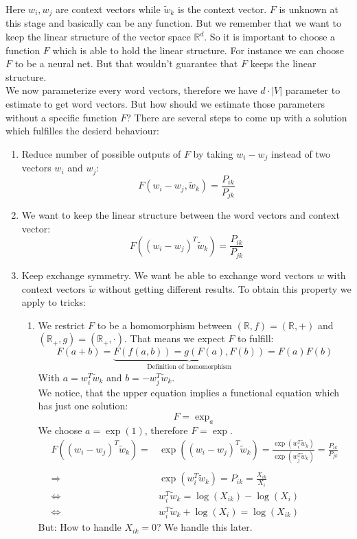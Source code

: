 Here $w_i, w_j$ are context vectors while $\tilde{w}_k$ is the context vector. 
$F$ is unknown at this stage and basically can be any function. But we remember
that we want to keep the linear structure of the vector space $\mathbb{R}^d$. So 
it is important to choose a function $F$ which is able to hold the linear 
structure. For instance we can choose $F$ to be a neural net. But that wouldn't 
guarantee that $F$ keeps the linear structure. \\

We now parameterize every word vectors, therefore we have $d \cdot |V|$ 
parameter to estimate to get word vectors. But how should we estimate those parameters 
without a specific function $F$? There are several steps to come up with a solution
which fulfilles the desierd behaviour:

\begin{enumerate}
  \item 
    Reduce number of possible outputs of $F$ by taking $w_i - w_j$ instead of 
    two vectors $w_i$ and $w_j$:
    \[
    F(w_i - w_j, \tilde{w}_k) = \frac{P_{ik}}{P_{jk}}
    \]

  \item 
    We want to keep the linear structure between the word vectors and context
    vector:
    \[
    F\left((w_i - w_j)^T\tilde{w}_k\right) = \frac{P_{ik}}{P_{jk}}
    \]
   
  \item 
    Keep exchange symmetry. We want be able to exchange word vectors $w$ with
    context vectors $\tilde{w}$ without getting different results. To obtain
    this property we apply to tricks:
      \begin{enumerate}
        \item 
          We restrict $F$ to be a homomorphism between $(\mathbb{R}, f) = (\mathbb{R}, +)$ 
          and $(\mathbb{R}_+, g) = (\mathbb{R}_+, \cdot )$. That means we expect $F$
          to fulfill:
          \[
          F(a + b) = \underbrace{F(f(a, b)) = g(F(a), F(b))}_{\text{Definition of homomorphism}} =
            F(a)F(b)
          \]
          With $a = w_i^T\tilde{w}_k$ and $b = -w_j^T\tilde{w}_k$. \\
          We notice, that the upper equation implies a functional equation which has
          just one solution: 
          \[
          F = \exp_a
          \]  
          We choose $a = \exp(1)$, therefore $F = \exp$. 
          \begin{align*}
          F\left((w_i - w_j)^T\tilde{w}_k\right) = &\exp\left((w_i - w_j)^T\tilde{w}_k\right) =
            \frac{\exp(w_i^T\tilde{w}_k)}{\exp(w_j^T\tilde{w}_k)} = \frac{P_{ik}}{P_{jk}} \\ \\
          \Rightarrow\ &\exp(w_i^T\tilde{w}_k) = P_{ik} = \frac{X_{ik}}{X_i} \\
          \Leftrightarrow\ &w_i^T\tilde{w}_k = \log(X_{ik}) - \log(X_i) \\
          \Leftrightarrow\ &w_i^T\tilde{w}_k + \log(X_i) = \log(X_{ik})
          \end{align*}
          But: How to handle $X_{ik} = 0$? We handle this later.
   

\end{enumerate}
\end{enumerate}
